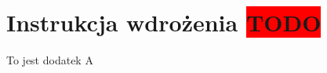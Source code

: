 \chapter{Instrukcja wdrożenia \colorbox{red}{TODO}}
\label{ch:instrukcja-wdrozenia}
To jest dodatek A
